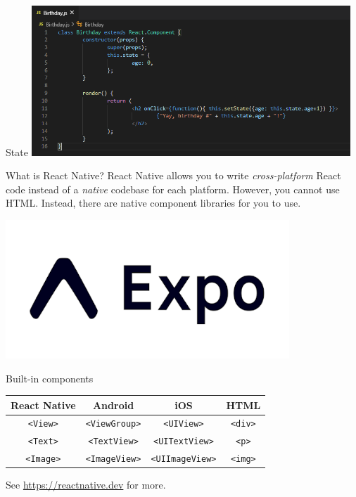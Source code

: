\documentclass{beamer}
\begin{document}
\begin{frame}{State}
	\centering
	\includegraphics[width=0.9\textwidth]{figs/state.png}
\end{frame}

\begin{frame}{What is React Native?}
	React Native allows you to write \emph{cross-platform} React code instead of a \emph{native} codebase for each platform. However, you cannot use HTML. Instead,
	there are native component libraries for you to use.

	\bigskip\pause

	\centering
	\includegraphics[width=0.8\textwidth]{figs/expo.png}
\end{frame}

\begin{frame}{Built-in components}
	\centering
	\begin{tabular}{|c|c|c|c|}
		\hline
		\textbf{React Native} & \textbf{Android} & \textbf{iOS} & \textbf{HTML} \\
		\hline
		\texttt{<View>} & \texttt{<ViewGroup>} & \texttt{<UIView>} & \texttt{<div>} \\
		\texttt{<Text>} & \texttt{<TextView>} & \texttt{<UITextView>} & \texttt{<p>} \\
		\texttt{<Image>} & \texttt{<ImageView>} & \texttt{<UIImageView>}  & \texttt{<img>} \\
		\hline
	\end{tabular}
	
	\bigskip\pause

	See \href{https://reactnative.dev}{https://reactnative.dev} for more.
\end{frame}
\end{document}
